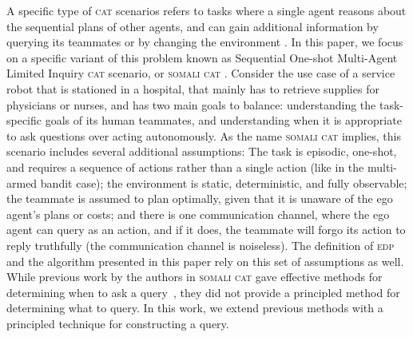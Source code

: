 \documentclass[letterpaper]{article}
\begin{document}
A specific type of \textsc{cat} scenarios refers to tasks where a single agent reasons about the sequential plans of other agents, and can gain additional information by querying its teammates or by changing the environment \cite{mirsky2018sequential,mirskypenny,shvo2020active}. In this paper, we focus on a specific variant of this problem known as Sequential One-shot Multi-Agent Limited Inquiry \textsc{cat} scenario, or \textsc{somali cat} \cite{mirskypenny}. Consider the use case of a service robot that is stationed in a hospital, that mainly has to retrieve supplies for physicians or nurses, and has two main goals to balance: understanding the task-specific goals of its human teammates, and understanding when it is appropriate to ask questions over acting autonomously. As the name \textsc{somali cat} implies, this scenario includes several additional assumptions: The task is episodic, one-shot, and requires a sequence of actions rather than a single action (like in the multi-armed bandit case); the environment is static, deterministic, and fully observable; the teammate is assumed to plan optimally, given that it is unaware of the ego agent's plans or costs; and there is one communication channel, where the ego agent can query as an action, and if it does, the teammate will forgo its action to reply truthfully (the communication channel is noiseless). The definition of \textsc{edp} and the algorithm presented in this paper rely on this set of assumptions as well. While previous work by the authors in \textsc{somali cat} gave effective methods for determining when to ask a query~\cite{mirskypenny}, they did not provide a principled method for determining what to query. In this work, we extend previous methods with a principled technique for constructing a query.
\end{document}
